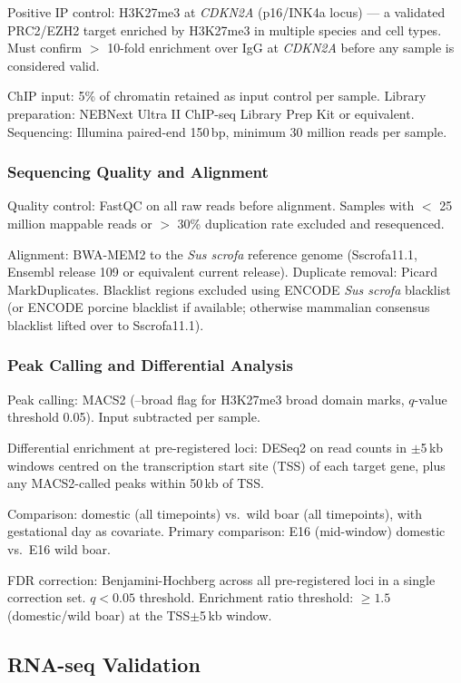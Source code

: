 \documentclass[10pt, a4paper]{article}
\begin{document}
Positive IP control: H3K27me3 at
\textit{CDKN2A} (p16/INK4a locus) ---
a validated PRC2/EZH2 target enriched by
H3K27me3 in multiple species and cell types.
Must confirm $>$ 10-fold enrichment over IgG
at \textit{CDKN2A} before any sample
is considered valid.

ChIP input: 5\% of chromatin retained
as input control per sample.
Library preparation: NEBNext Ultra II
ChIP-seq Library Prep Kit or equivalent.
Sequencing: Illumina paired-end 150\,bp,
minimum 30 million reads per sample.

\subsubsection{Sequencing Quality and
Alignment}

Quality control: FastQC on all raw reads
before alignment. Samples with $<$ 25 million
mappable reads or $>$ 30\% duplication rate
excluded and resequenced.

Alignment: BWA-MEM2 to the \textit{Sus scrofa}
reference genome (Sscrofa11.1, Ensembl release
109 or equivalent current release).
Duplicate removal: Picard MarkDuplicates.
Blacklist regions excluded using
ENCODE \textit{Sus scrofa} blacklist
(or ENCODE porcine blacklist if available;
otherwise mammalian consensus blacklist
lifted over to Sscrofa11.1).

\subsubsection{Peak Calling and
Differential Analysis}

Peak calling: MACS2 (--broad flag for
H3K27me3 broad domain marks,
$q$-value threshold 0.05).
Input subtracted per sample.

Differential enrichment at pre-registered
loci: DESeq2 on read counts in
$\pm$5\,kb windows centred on the
transcription start site (TSS) of each
target gene, plus any MACS2-called
peaks within 50\,kb of TSS.

Comparison: domestic (all timepoints) vs.\
wild boar (all timepoints), with gestational
day as covariate. Primary comparison:
E16 (mid-window) domestic vs.\ E16 wild boar.

FDR correction: Benjamini-Hochberg across
all pre-registered loci in a single
correction set. $q < 0.05$ threshold.
Enrichment ratio threshold: $\geq 1.5$
(domestic/wild boar) at the TSS$\pm$5\,kb
window.

\subsection{RNA-seq Validation}
\end{document}
